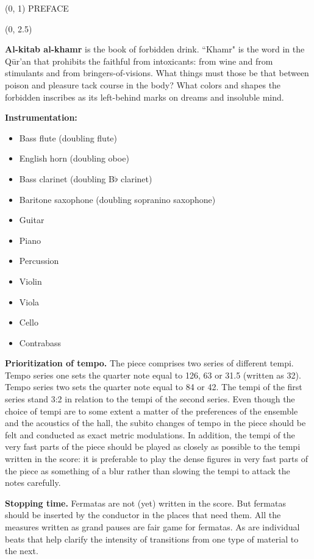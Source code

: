 \documentclass[10pt]{article}
\begin{document}
\begin{textblock}{23}(0, 1)
\center \huge PREFACE
\end{textblock}

\begin{textblock}{23}(0, 2.5)

\textbf{Al-kitab al-khamr} is the book of forbidden drink. ``Khamr" is the word
in the Q\={u}r'an that prohibits the faithful from intoxicants: from wine and
from stimulants and from bringers-of-visions. What things must those be that
between poison and pleasure tack course in the body? What colors and shapes the
forbidden inscribes as its left-behind marks on dreams and insoluble mind.

\textbf{Instrumentation:}

\begin{itemize} \itemsep2pt
\item Bass flute (doubling flute)
\item English horn (doubling oboe)
\item Bass clarinet (doubling B$\flat$ clarinet)
\item Baritone saxophone (doubling sopranino saxophone)
\item Guitar
\item Piano
\item Percussion
\item Violin
\item Viola
\item Cello
\item Contrabass
\end{itemize}


\textbf{Prioritization of tempo.} The piece comprises two series of different
tempi. Tempo series one sets the quarter note equal to 126, 63 or 31.5 (written
as 32). Tempo series two sets the quarter note equal to 84 or 42. The tempi of
the first series stand 3:2 in relation to the tempi of the second series.
Even though the choice of tempi are to some extent a matter of the preferences
of the ensemble and the acoustics of the hall, the subito changes of tempo in
the piece should be felt and conducted as exact metric modulations. In
addition, the tempi of the very fast parts of the piece should be played as
closely as possible to the tempi written in the score: it is preferable to play
the dense figures in very fast parts of the piece as something of a blur rather
than slowing the tempi to attack the notes carefully.

\textbf{Stopping time.} Fermatas are not (yet) written in the score. But
fermatas should be inserted by the conductor in the places that need them. All
the measures written as grand pauses are fair game for fermatas. As are
individual beats that help clarify the intensity of transitions from one type
of material to the next.


\end{textblock}
\end{document}
